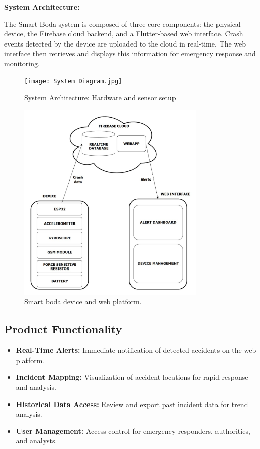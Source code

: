 \documentclass[12pt]{article}
\begin{document}
\textbf{System Architecture:}

The Smart Boda system is composed of three core components: the physical device, the Firebase cloud backend, and a Flutter-based web interface. Crash events detected by the device are uploaded to the cloud in real-time. The web interface then retrieves and displays this information for emergency response and monitoring.

\begin{figure}[H]
  \centering
  \texttt{[image: System Diagram.jpg]}
  \caption{System Architecture: Hardware and sensor setup}
  \label{fig:architecture}
\end{figure}

\begin{figure}[H]
  \centering
  \includegraphics[width=0.8\textwidth]{PHOTO-2025-07-28-12-34-26.jpg}
  \caption{Smart boda device and web platform.}
  \label{fig:new_image}
\end{figure}

\subsection{Product Functionality}
\begin{itemize}
  \item \textbf{Real-Time Alerts:} Immediate notification of detected accidents on the web platform.
  \item \textbf{Incident Mapping:} Visualization of accident locations for rapid response and analysis.
  \item \textbf{Historical Data Access:} Review and export past incident data for trend analysis.
  \item \textbf{User Management:} Access control for emergency responders, authorities, and analysts.
\end{itemize}
\end{document}

